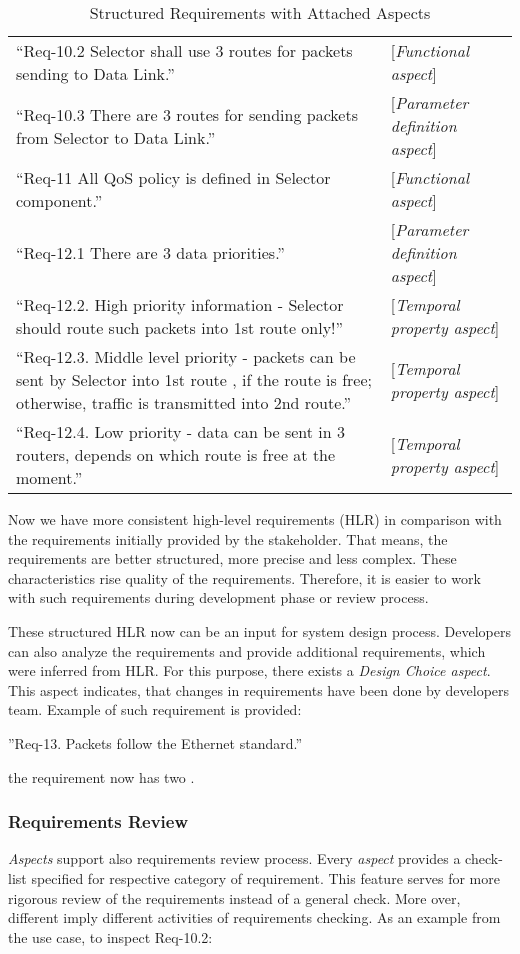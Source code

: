 \begin{table*}
\begin{tabular}{| p{11cm}  | p{6cm} |}
``Req-10.2	Selector shall use 3 routes for packets sending to Data Link.'' & [\textit{Functional aspect}] \\
``Req-10.3	There are 3 routes for sending packets from Selector to Data Link.'' & [\textit{Parameter definition aspect}] \\
``Req-11	All QoS policy is defined in Selector component.'' & [\textit{Functional aspect}] \\
``Req-12.1	There are 3 data priorities.'' & [\textit{Parameter definition aspect}] \\
``Req-12.2.	High priority information - Selector should route such packets into 1st route only!'' & 
[\textit{Temporal property aspect}] \\
``Req-12.3.	Middle level priority - packets can be sent by Selector into 1st route , if the route is free; otherwise, traffic is transmitted into 2nd route.'' & [\textit{Temporal property aspect}] \\
``Req-12.4.	Low priority - data can be sent in 3 routers, depends on which route is free at the moment.'' & [\textit{Temporal property aspect}] \\
		\end{tabular}
	\caption{Structured Requirements with Attached Aspects}
	\label{tab:structuredHLR}
\end{table*}

\normalsize
Now we have more consistent high-level requirements (HLR) in comparison with the requirements initially provided by the stakeholder. That means, the requirements are better structured, more precise and less complex. These characteristics rise quality of the requirements. Therefore, it is easier to work with such requirements during development phase or review process.

These structured HLR now can be an input for system design process. Developers can also analyze the requirements and provide additional requirements, which were inferred from HLR. For this purpose, there exists a \textit{Design Choice aspect}. This aspect indicates, that changes in requirements have been done by developers team. Example of such requirement is provided:

\small''Req-13.  Packets follow the Ethernet standard.''

\normalsize the requirement now has two . 


\normalsize \subsubsection{Requirements Review}
\textit{Aspects} support also requirements review process. Every \textit{aspect} provides a check-list specified for respective category of requirement. This feature serves for more rigorous review of the requirements instead of a general check. More over, different \asp imply different activities of requirements checking. As an example from the use case, to inspect Req-10.2: \\

